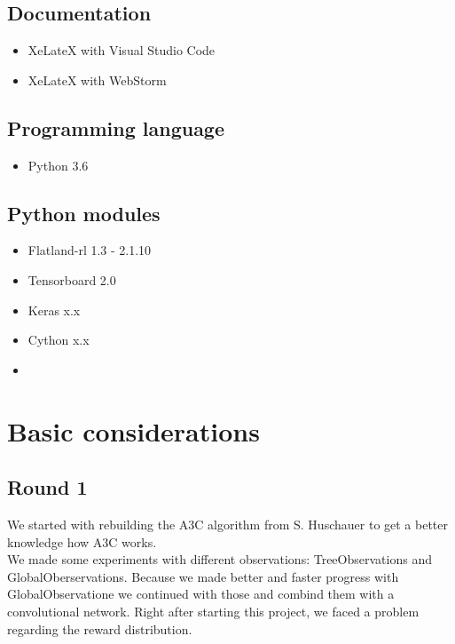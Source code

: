 \subsection*{Documentation}\label{dokutools}
\begin{itemize}
	\item XeLateX with Visual Studio Code
	\item XeLateX with WebStorm
\end{itemize}


\subsection*{Programming language}\label{programminglanguages}
\begin{itemize}
	\item Python 3.6
\end{itemize}

\subsection*{Python modules}\label{modules}
\begin{itemize}
	\item Flatland-rl 1.3 - 2.1.10
	\item Tensorboard 2.0
	\item Keras x.x
	\item Cython x.x
	\item %
\end{itemize}


\section{Basic considerations}

\subsection{Round 1}
We started with rebuilding the A3C algorithm from S. Huschauer to get a better knowledge how A3C works.\\
We made some experiments with different observations: TreeObservations and GlobalOberservations.
Because we made better and faster progress with GlobalObservatione we continued with those and combind them with a convolutional network.
Right after starting this project, we faced a problem regarding the reward distribution.\\


